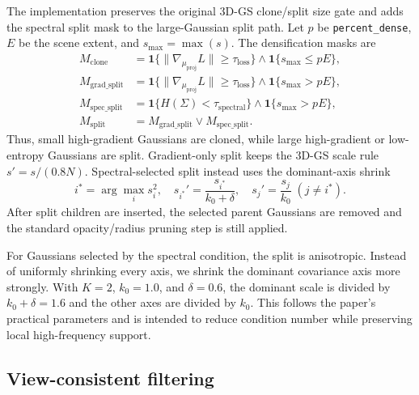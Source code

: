 \documentclass{article}
\begin{document}
The implementation preserves the original 3D-GS clone/split size gate and adds the spectral split mask to the large-Gaussian split path. Let $p$ be \texttt{percent\_dense}, $E$ be the scene extent, and $s_{\max}=\max(s)$. The densification masks are
\begin{equation}
\begin{aligned}
M_{\mathrm{clone}} &=
\mathbf{1}\{\|\nabla_{\mu_{\mathrm{proj}}}L\|\ge\tau_{\mathrm{loss}}\}
\land \mathbf{1}\{s_{\max}\le pE\},\\
M_{\mathrm{grad\_split}} &=
\mathbf{1}\{\|\nabla_{\mu_{\mathrm{proj}}}L\|\ge\tau_{\mathrm{loss}}\}
\land \mathbf{1}\{s_{\max}>pE\},\\
M_{\mathrm{spec\_split}} &=
\mathbf{1}\{H(\Sigma)<\tau_{\mathrm{spectral}}\}
\land \mathbf{1}\{s_{\max}>pE\},\\
M_{\mathrm{split}} &= M_{\mathrm{grad\_split}}\lor M_{\mathrm{spec\_split}}.
\end{aligned}
\end{equation}
Thus, small high-gradient Gaussians are cloned, while large high-gradient or low-entropy Gaussians are split. Gradient-only split keeps the 3D-GS scale rule $s'=s/(0.8N)$. Spectral-selected split instead uses the dominant-axis shrink
\begin{equation}
    i^*=\arg\max_i s_i^2,\quad
    s_{i^*}'=\frac{s_{i^*}}{k_0+\delta},\quad
    s_j'=\frac{s_j}{k_0}\;(j\ne i^*).
\end{equation}
After split children are inserted, the selected parent Gaussians are removed and the standard opacity/radius pruning step is still applied.

For Gaussians selected by the spectral condition, the split is anisotropic. Instead of uniformly shrinking every axis, we shrink the dominant covariance axis more strongly. With $K=2$, $k_0=1.0$, and $\delta=0.6$, the dominant scale is divided by $k_0+\delta=1.6$ and the other axes are divided by $k_0$. This follows the paper's practical parameters and is intended to reduce condition number while preserving local high-frequency support.

\subsection{View-consistent filtering}
\end{document}
